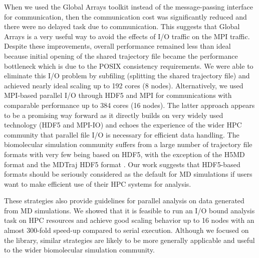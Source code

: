 When we used the Global Arrays toolkit instead of the message-passing interface for communication, then the communication cost was significantly reduced and there were no delayed task due to communication.
This suggests that Global Arrays is a very useful way to avoid the effects of I/O traffic on the MPI traffic.
Despite these improvements, overall performance remained less than ideal because initial opening of the shared trajectory file became the performance bottleneck which is due to the POSIX consistency requirements.
We were able to eliminate this I/O problem by subfiling (splitting the shared trajectory file) and achieved nearly ideal scaling up to 192 cores (8 nodes).
Alternatively, we used MPI-based parallel I/O through HDF5 and MPI for communications with comparable performance up to 384 cores (16 nodes). 
The latter approach appears to be a promising way forward as it directly builds on very widely used technology (HDF5 and MPI-IO) and echoes the experience of the wider HPC community that parallel file I/O is necessary for efficient data handling.
The biomolecular simulation community suffers from a large number of trajectory file formats with very few being based on HDF5, with the exception of the H5MD format \cite{Buyl:2014aa} and the MDTraj HDF5 format \cite{McGibbon:2015aa}.
Our work suggests that HDF5-based formats should be seriously considered as the default for MD simulations if users want to make efficient use of their HPC systems for analysis. 



%

These strategies also provide guidelines for parallel analysis on data generated from MD simulations.
We showed that it is feasible to run an I/O bound analysis task on HPC resources and achieve good scaling behavior up to 16 nodes with an almost 300-fold speed-up compared to serial execution.
Although we focused on the  library, similar strategies are likely to be more generally applicable and useful to the wider biomolecular simulation community.


